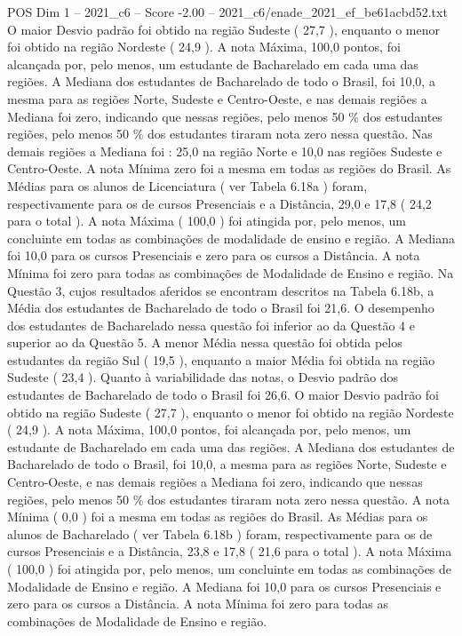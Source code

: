 \begin{textsample}{POS Dim 1 – 2021\_c6 – Score -2.00 – 2021\_c6/enade\_2021\_ef\_be61acbd52.txt}
O maior Desvio padrão foi obtido na região Sudeste ( 27,7 ), enquanto o menor foi obtido na região Nordeste ( 24,9 ).
A nota Máxima, 100,0 pontos, foi alcançada por, pelo menos, um estudante de Bacharelado em cada uma das regiões.
A Mediana dos estudantes de Bacharelado de todo o Brasil, foi 10,0, a mesma para as regiões Norte, Sudeste e Centro-Oeste, e nas demais regiões a Mediana foi zero, indicando que nessas regiões, pelo menos 50 \% dos estudantes regiões, pelo menos 50 \% dos estudantes tiraram nota zero nessa questão.
Nas demais regiões a Mediana foi : 25,0 na região Norte e 10,0 nas regiões Sudeste e Centro-Oeste.
A nota Mínima zero foi a mesma em todas as regiões do Brasil.
As Médias para os alunos de Licenciatura ( ver Tabela 6.18a ) foram, respectivamente para os de cursos Presenciais e a Distância, 29,0 e 17,8 ( 24,2 para o total ).
A nota Máxima ( 100,0 ) foi atingida por, pelo menos, um concluinte em todas as combinações de modalidade de ensino e região.
A Mediana foi 10,0 para os cursos Presenciais e zero para os cursos a Distância.
A nota Mínima foi zero para todas as combinações de Modalidade de Ensino e região.
Na Questão 3, cujos resultados aferidos se encontram descritos na Tabela 6.18b, a Média dos estudantes de Bacharelado de todo o Brasil foi 21,6.
O desempenho dos estudantes de Bacharelado nessa questão foi inferior ao da Questão 4 e superior ao da Questão 5.
A menor Média nessa questão foi obtida pelos estudantes da região Sul ( 19,5 ), enquanto a maior Média foi obtida na região Sudeste ( 23,4 ).
Quanto à variabilidade das notas, o Desvio padrão dos estudantes de Bacharelado de todo o Brasil foi 26,6.
O maior Desvio padrão foi obtido na região Sudeste ( 27,7 ), enquanto o menor foi obtido na região Nordeste ( 24,9 ).
A nota Máxima, 100,0 pontos, foi alcançada por, pelo menos, um estudante de Bacharelado em cada uma das regiões.
A Mediana dos estudantes de Bacharelado de todo o Brasil, foi 10,0, a mesma para as regiões Norte, Sudeste e Centro-Oeste, e nas demais regiões a Mediana foi zero, indicando que nessas regiões, pelo menos 50 \% dos estudantes tiraram nota zero nessa questão.
A nota Mínima ( 0,0 ) foi a mesma em todas as regiões do Brasil.
As Médias para os alunos de Bacharelado ( ver Tabela 6.18b ) foram, respectivamente para os de cursos Presenciais e a Distância, 23,8 e 17,8 ( 21,6 para o total ).
A nota Máxima ( 100,0 ) foi atingida por, pelo menos, um concluinte em todas as combinações de Modalidade de Ensino e região.
A Mediana foi 10,0 para os cursos Presenciais e zero para os cursos a Distância.
A nota Mínima foi zero para todas as combinações de Modalidade de Ensino e região.

\end{textsample}
